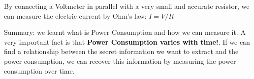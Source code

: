 By connecting a Voltmeter in parallel with a very small and accurate resistor, we can measure the
electric current by Ohm's law: $I=V/R$

Summary: we learnt what is Power Consumption and how we can measure it.
A very important fact is that \textbf{Power Consumption varies with time!}.
If we can find a relationship between the secret information we want to extract and
the power consumption, we can recover this information by measuring the power consumption over time.


